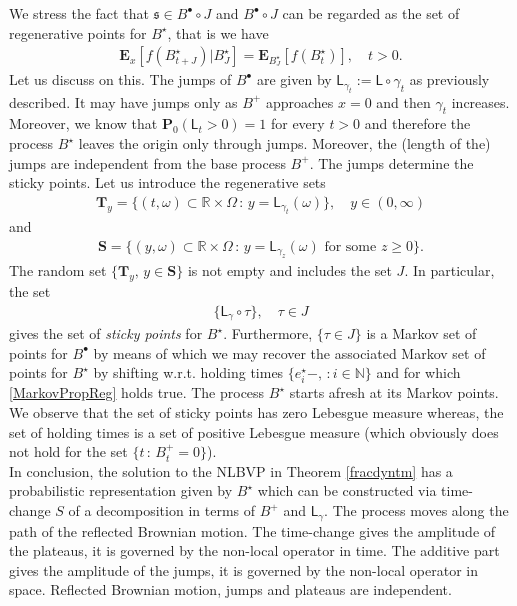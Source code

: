 \documentclass[11pt,a4paper]{article}
\theoremstyle{plain}
\theoremstyle{definition}
\theoremstyle{remark}
\begin{document}
		We stress the fact that  $\mathfrak{s} \in B^\bullet \circ J$ and $B^\bullet \circ J$ can be regarded as the set of regenerative points for $B^\star$, that is we have
		\begin{align}
			\label{MarkovPropReg}
			\mathbf{E}_x\left[ f(B^\star_{t + J}) \big| B^\star_{J} \right] = \mathbf{E}_{B^\star_{J}} \left[ f(B^\star_t) \right], \quad t>0.
		\end{align}
		Let us discuss on this. The jumps of $B^\bullet$ are given by $\mathsf{L}_{\gamma_t}:= \mathsf{L} \circ \gamma_t$ as previously described. It may have jumps only as $B^+$ approaches $x=0$ and then $\gamma_t$ increases. Moreover, we know that $\mathbf{P}_0(\mathsf{L}_t > 0)=1$ for every $t>0$ and therefore the process $B^\star$ leaves the origin only through jumps. Moreover, the (length of the) jumps are independent from the base process $B^+$. The jumps determine the sticky points. Let us introduce the regenerative sets
		\begin{align*}
			\mathbf{T}_y = \{ (t, \omega) \subset \mathbb{R} \times \Omega \, : \, y=\mathsf{L}_{\gamma_{t}}(\omega) \}, \quad y \in (0, \infty)
		\end{align*}   
		and
		\begin{align*}
			\mathbf{S} = \{ (y, \omega) \subset \mathbb{R} \times \Omega \, : \, y=\mathsf{L}_{\gamma_{z}}(\omega) \textrm{ for some } z \geq 0 \}.
		\end{align*}   
		The random set $\{\mathbf{T}_y,\, y \in \mathbf{S}\}$ is not empty and includes the set $J$. In particular, the set
		\begin{align*}
			\{\mathsf{L}_\gamma \circ \tau\}, \quad \tau \in J
		\end{align*}
		gives the set of \textit{sticky points} for $B^\star$. Furthermore, $\{\tau \in J\}$ is a Markov set of points for $B^\bullet$ by means of which we may recover the associated Markov set of points for $B^\star$ by shifting w.r.t. holding times $\{e^\star_i -, \, : i \in \mathbb{N}\}$ and for which \eqref{MarkovPropReg} holds true. 
		The process $B^\star$ starts afresh at its Markov points. We observe that the set of sticky points has zero Lebesgue measure whereas, the set of holding times is a set of positive Lebesgue measure (which obviously does not hold for the set $\{t\,:\, B^+_t=0\}$).\\
		
		
		
		
		In conclusion, the solution to the NLBVP in Theorem \ref{fracdyntm} has a probabilistic representation given by $B^\star$ which can be constructed via time-change $S$ of a decomposition in terms of $B^+$ and $\mathsf{L}_\gamma$. The process moves along the path of  the reflected Brownian motion. The time-change gives the amplitude of the plateaus, it is governed by the non-local operator in time. The additive part gives the amplitude of the jumps, it is governed by the non-local operator in space. Reflected Brownian motion, jumps and plateaus are independent.
		
\end{document}
